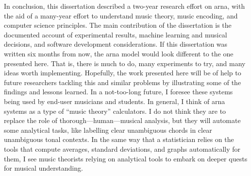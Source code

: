 
In conclusion, this dissertation described a two-year
research effort on \gls{arna}, with the aid of a many-year
effort to understand music theory, music encoding, and
computer science principles. The main contribution of the
dissertation is the documented account of experimental
results, machine learning and musical decisions, and
software development considerations. If this dissertation
was written six months from now, the \gls{arna} model would
look different to the one presented here. That is, there is
much to do, many experiments to try, and many ideas worth
implementing. Hopefully, the work presented here will be of
help to future researchers tackling this and similar
problems by illustrating some of the findings and lessons
learned. In a not-too-long future, I foresee these systems
being used by end-user musicians and students. In general, I
think of \gls{arna} systems as a type of ``music theory''
calculators. I do not think they are to replace the role of
thorough---human---musical analysis, but they will automate
some analytical tasks, like labelling clear unambiguous
chords in clear unambiguous tonal contexts. In the same way
that a statistician relies on the tools that compute
averages, standard deviations, and graphs automatically for
them, I see music theorists relying on analytical tools to
embark on deeper quests for musical understanding. 
